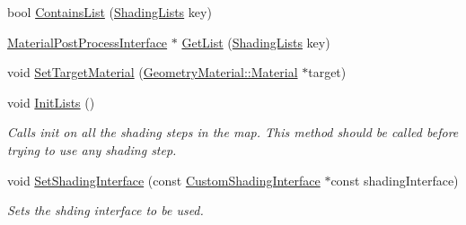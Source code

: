 \begin{DoxyCompactItemize}
bool \mbox{\hyperlink{class_geometry_engine_1_1_custom_shading_1_1_multi_shading_interface_afee05bccc3a80cd62df3f71c119bc074}{Contains\+List}} (\mbox{\hyperlink{namespace_geometry_engine_1_1_custom_shading_a9bfcbfb6d734e4d6fb8e2c661b987db6}{Shading\+Lists}} key)
\item 
\mbox{\hyperlink{class_geometry_engine_1_1_custom_shading_1_1_material_post_process_interface}{Material\+Post\+Process\+Interface}} $\ast$ \mbox{\hyperlink{class_geometry_engine_1_1_custom_shading_1_1_multi_shading_interface_a37238d79bf72705b03e46899c6e4cf2f}{Get\+List}} (\mbox{\hyperlink{namespace_geometry_engine_1_1_custom_shading_a9bfcbfb6d734e4d6fb8e2c661b987db6}{Shading\+Lists}} key)
\item 
void \mbox{\hyperlink{class_geometry_engine_1_1_custom_shading_1_1_multi_shading_interface_a01ed5b783765986ca3f7557ae884cf68}{Set\+Target\+Material}} (\mbox{\hyperlink{class_geometry_engine_1_1_geometry_material_1_1_material}{Geometry\+Material\+::\+Material}} $\ast$target)
\item 
\mbox{\label{class_geometry_engine_1_1_custom_shading_1_1_multi_shading_interface_aefbcc8169d1ab2ee6804c606234013d7}} 
void \mbox{\hyperlink{class_geometry_engine_1_1_custom_shading_1_1_multi_shading_interface_aefbcc8169d1ab2ee6804c606234013d7}{Init\+Lists}} ()
\begin{DoxyCompactList}\small\item\em Calls init on all the shading steps in the map. This method should be called before trying to use any shading step. \end{DoxyCompactList}\item 
\mbox{\label{class_geometry_engine_1_1_custom_shading_1_1_multi_shading_interface_ae608b1dd5b126bc76538c85df1a66674}} 
void \mbox{\hyperlink{class_geometry_engine_1_1_custom_shading_1_1_multi_shading_interface_ae608b1dd5b126bc76538c85df1a66674}{Set\+Shading\+Interface}} (const \mbox{\hyperlink{class_geometry_engine_1_1_custom_shading_1_1_custom_shading_interface}{Custom\+Shading\+Interface}} $\ast$const shading\+Interface)
\begin{DoxyCompactList}\small\item\em Sets the shding interface to be used. \end{DoxyCompactList}\item 
\mbox{\label{class_geometry_engine_1_1_custom_shading_1_1_multi_shading_interface_a21461546d936b94641926f0a1ed73557}} 

\end{DoxyCompactItemize}
